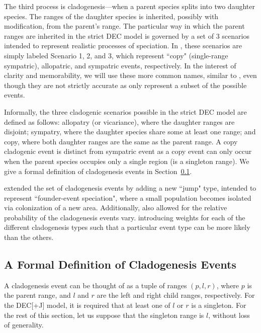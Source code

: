 \documentclass{article}
\begin{document}
The third process is cladogenesis---when a parent species splits into two
daughter species.
The ranges of the daughter species is inherited, possibly with modification,
from the parent's range.
The particular way in which the parent ranges are inherited in the strict DEC
model is governed by a set of 3 scenarios intended to represent realistic
processes of speciation.
In \citet{ALikelihoodFrReeR2005}, these scenarios are simply labeled Scenario 1,
2, and 3, which represent ``copy" (single-range sympatric), allopatric, and
sympatric events, respectively.
In the interest of clarity and memorability, we will use these more common
names, similar to \citet{ModelSelectionMatzke2014}, even though they are not
strictly accurate as only represent a subset of the possible events.

Informally, the three cladogenic scenarios possible in the strict DEC model
are defined as follows: allopatry (or vicariance), where the daughter ranges are
disjoint; sympatry, where the daughter species share some at least one range;
and copy, where both daughter ranges are the same as the parent range.
A copy cladogenic event is distinct from sympatric event as a copy event can
only occur when the parent species occupies only a single region (is a singleton
range).
We give a formal definition of cladogenesis events in
Section~\ref{sec:formal-cladogenesis}.

\citet{ModelSelectionMatzke2014} extended the set of cladogenesis events by
adding a new ``jump" type, intended to represent ``founder-event speciation",
where a small population becomes isolated via colonization of a new area.
Additionally, \citet{ModelSelectionMatzke2014} also allowed for the relative probability
of the cladogenesis events vary.
introducing weights for each of the different cladogenesis types such that a
particular event type can be more likely than the others.

\subsection{A Formal Definition of Cladogenesis Events}
\label{sec:formal-cladogenesis}

A cladogenesis event can be thought of as a tuple of ranges $(p, l, r)$, where
$p$ is the parent range, and $l$ and $r$ are the left and right child ranges,
respectively. For the DEC[+J] model, it is required that at least one of $l$ or
$r$ is a singleton. For the rest of this section, let us suppose that the
singleton range is $l$, without loss of generality.
\end{document}
